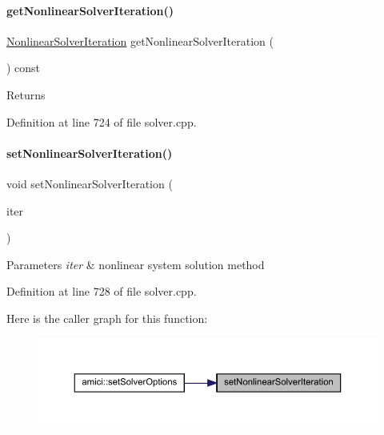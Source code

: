 \paragraph{\texorpdfstring{getNonlinearSolverIteration()}{getNonlinearSolverIteration()}}
{\footnotesize\ttfamily \mbox{\hyperlink{namespaceamici_a13388d34e4c35bb592c3e821c35cc923}{Nonlinear\+Solver\+Iteration}} get\+Nonlinear\+Solver\+Iteration (\begin{DoxyParamCaption}{ }\end{DoxyParamCaption}) const}

\begin{DoxyReturn}{Returns}

\end{DoxyReturn}


Definition at line 724 of file solver.\+cpp.

\mbox{\label{classamici_1_1_solver_a1dc7983f545ee95f7e6fb38cfb0b3286}} 
\paragraph{\texorpdfstring{setNonlinearSolverIteration()}{setNonlinearSolverIteration()}}
{\footnotesize\ttfamily void set\+Nonlinear\+Solver\+Iteration (\begin{DoxyParamCaption}\item[{\mbox{\hyperlink{namespaceamici_a13388d34e4c35bb592c3e821c35cc923}{Nonlinear\+Solver\+Iteration}}}]{iter }\end{DoxyParamCaption})}


\begin{DoxyParams}{Parameters}
{\em iter} & nonlinear system solution method \\
\hline
\end{DoxyParams}


Definition at line 728 of file solver.\+cpp.

Here is the caller graph for this function\+:
\nopagebreak
\begin{figure}[H]
\begin{center}
\leavevmode
\includegraphics[width=350pt]{classamici_1_1_solver_a1dc7983f545ee95f7e6fb38cfb0b3286_icgraph}
\end{center}
\end{figure}
\mbox{\label{classamici_1_1_solver_a69568ccb5de1bcdd4344e105ddb12324}} 

